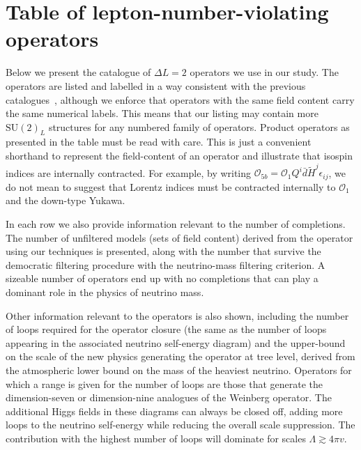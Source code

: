 
\chapter{Table of lepton-number-violating operators}
\label{chapter:operator-table}

Below we present the catalogue of $\Delta L = 2$ operators we use in our study.
The operators are listed and labelled in a way consistent with the previous
catalogues~\cite{Babu:2001ex,deGouvea:2007qla}, although we enforce that
operators with the same field content carry the same numerical labels. This
means that our listing may contain more $\mathrm{SU}(2)_{L}$ structures for any
numbered family of operators. Product operators as presented in the table must
be read with care. This is just a convenient shorthand to represent the
field-content of an operator and illustrate that isospin indices are internally
contracted. For example, by writing
$\mathcal{O}_{5b} = \mathcal{O}_{1} Q^{i} \bar{d} \tilde{H}^{j} \epsilon_{ij}$,
we do not mean to suggest that Lorentz indices must be contracted internally to
$\mathcal{O}_{1}$ and the down-type Yukawa.

In each row we also provide information relevant to the number of completions.
The number of unfiltered models (sets of field content) derived from the
operator using our techniques is presented, along with the number that survive
the democratic filtering procedure with the neutrino-mass filtering criterion. A
sizeable number of operators end up with no completions that can play a dominant
role in the physics of neutrino mass.

Other information relevant to the operators is also shown, including the number
of loops required for the operator closure (the same as the number of loops
appearing in the associated neutrino self-energy diagram) and the upper-bound on
the scale of the new physics generating the operator at tree level, derived from
the atmospheric lower bound on the mass of the heaviest neutrino. Operators for
which a range is given for the number of loops are those that generate the
dimension-seven or dimension-nine analogues of the Weinberg operator. The
additional Higgs fields in these diagrams can always be closed off, adding more
loops to the neutrino self-energy while reducing the overall scale suppression.
The contribution with the highest number of loops will dominate for scales
$\Lambda \gtrsim 4\pi v$.

